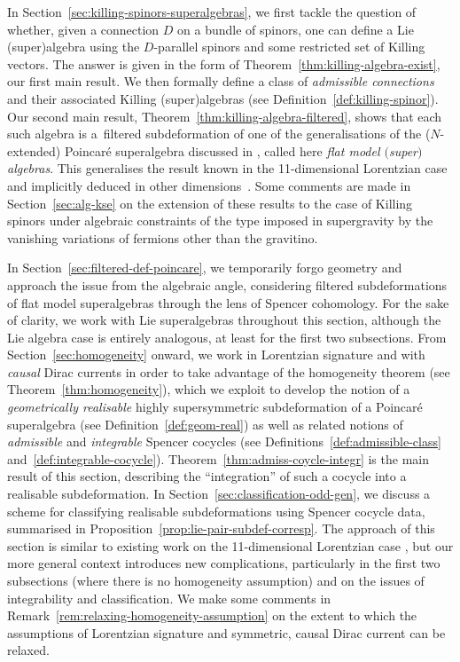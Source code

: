 \documentclass[pdftex]{sigma}
\numberwithin{equation}{section}
\newcommand{\1}{\mathbbm{1}}
\begin{document}
In Section~\ref{sec:killing-spinors-superalgebras}, we first tackle the question of whether, given a connection $D$ on a bundle of spinors, one can define a Lie (super)algebra using the $D$-parallel spinors and some restricted set of Killing vectors. The answer is given in the form of Theorem~\ref{thm:killing-algebra-exist}, our first main result. We then formally define a class of \emph{admissible connections} and their associated Killing (super)algebras (see Definition~\ref{def:killing-spinor}). Our second main result, Theorem~\ref{thm:killing-algebra-filtered}, shows that each such algebra is a~filtered subdeformation of one of the generalisations of the ($N$-extended) Poincar\'e superalgebra discussed in \cite{Alekseevsky1997}, called here \emph{flat model $($super$)$algebras}. This generalises the result known in the 11-dimensional Lorentzian case \cite[Theorem~12]{Figueroa-OFarrill2017_1} and implicitly deduced in other dimensions~\cite{Beckett2021,deMedeiros2016,deMedeiros2018}. Some comments are made in Section~\ref{sec:alg-kse} on the extension of these results to the case of Killing spinors under algebraic constraints of the type imposed in supergravity by the vanishing variations of fermions other than the gravitino.

In Section~\ref{sec:filtered-def-poincare}, we temporarily forgo geometry and approach the issue from the algebraic angle, considering filtered subdeformations of flat model superalgebras through the lens of Spencer cohomology. For the sake of clarity, we work with Lie superalgebras throughout this section, although the Lie algebra case is entirely analogous, at least for the first two subsections. From Section~\ref{sec:homogeneity} onward, we work in Lorentzian signature and with \emph{causal} Dirac currents in order to take advantage of the homogeneity theorem (see Theorem~\ref{thm:homogeneity}), which we exploit to develop the notion of a \emph{geometrically realisable} highly supersymmetric subdeformation of a Poincar\'e superalgebra (see Definition~\ref{def:geom-real}) as well as related notions of \emph{admissible} and \emph{integrable} Spencer cocycles (see Definitions~\ref{def:admissible-class} and~\ref{def:integrable-cocycle}). Theorem~\ref{thm:admiss-coycle-integr} is the main result of this section, describing the ``integration'' of such a cocycle into a realisable subdeformation. In Section~\ref{sec:classification-odd-gen}, we discuss a scheme for classifying realisable subdeformations using Spencer cocycle data, summarised in Proposition~\ref{prop:lie-pair-subdef-corresp}. The approach of this section is similar to existing work on the 11-dimensional Lorentzian case \cite{Figueroa-OFarrill2017_1, Santi2022}, but our more general context introduces new complications, particularly in the first two subsections (where there is no homogeneity assumption) and on the issues of integrability and classification. We make some comments in Remark~\ref{rem:relaxing-homogeneity-assumption} on the extent to which the assumptions of Lorentzian signature and symmetric, causal Dirac current can be relaxed.
\end{document}
